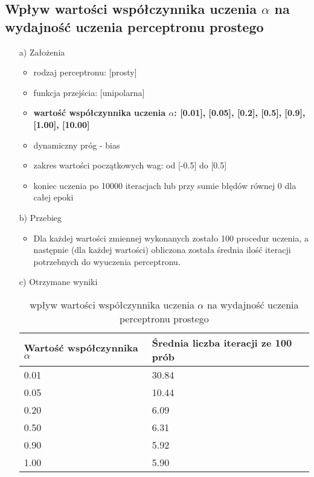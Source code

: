 \documentclass[17pt]{article}
\begin{document}
\subsection{Wpływ wartości współczynnika uczenia $\alpha$ na wydajność uczenia perceptronu prostego}
\vspace{4mm}
\begin{enumerate}

\item[a)] Założenia

\begin{itemize}
\item rodzaj perceptronu: [prosty]
\item funkcja przejścia: [unipolarna]
\item \textbf{wartość współczynnika uczenia $\alpha$: [0.01], [0.05], [0.2], [0.5], [0.9], [1.00], [10.00]}
\item dynamiczny próg - bias
\item zakres wartości początkowych wag: od [-0.5] do [0.5]
\item koniec uczenia po 10000 iteracjach lub przy sumie błędów równej 0 dla całej epoki
\end{itemize}
\newpage
\item[b)] Przebieg

\begin{itemize}
\item Dla każdej wartości zmiennej wykonanych zostało 100 procedur uczenia, a następnie (dla każdej wartości) obliczona została średnia ilość iteracji potrzebnych do wyuczenia perceptronu.
\end{itemize}
\item[c)] Otrzymane wyniki

\begin{table}[ht]
\centering
\begin{tabular}{|p{4cm}|p{4cm}|}
 \hline
 Wartość współczynnika $\alpha$ & Średnia liczba iteracji ze 100 prób\\ \hline
 0.01 & 30.84\\ 
 0.05 & 10.44\\ 
 0.20 & 6.09\\ 
 0.50 & 6.31\\ 
 0.90 & 5.92\\ 
 1.00 & 5.90\\ 
 \hline
\end{tabular}
\caption{\label{tab:table3}wpływ wartości współczynnika uczenia $\alpha$ na wydajność uczenia perceptronu prostego}
\end{table}


\end{enumerate}
\end{document}
